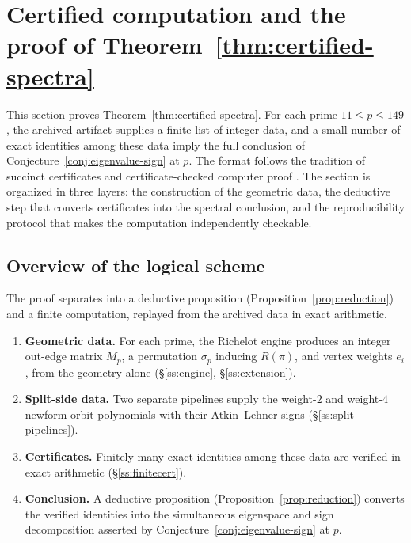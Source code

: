 \documentclass[11pt]{amsart}
\theoremstyle{plain}
\theoremstyle{definition}
\begin{document}
	\section{Certified computation and the proof of Theorem~\ref{thm:certified-spectra}}
	\label{sec:certificates}
	
	This section proves Theorem~\ref{thm:certified-spectra}. For each prime $11\le p\le149$, the archived artifact supplies a finite list of integer data, and a small number of exact identities among these data imply the full conclusion of Conjecture~\ref{conj:eigenvalue-sign} at $p$. The format follows the
	tradition of succinct certificates and certificate-checked computer proof
	\cite{Pratt1975,AtkinMorain1993,RSST1997}. The section is organized in
	three layers: the construction of the geometric data, the deductive step
	that converts certificates into the spectral conclusion, and the
	reproducibility protocol that makes the computation independently
	checkable.
	
	\subsection{Overview of the logical scheme}
	\label{ss:cert-overview}
	
	The proof separates into a deductive proposition (Proposition~\ref{prop:reduction}) and a finite computation, replayed from the archived data in exact arithmetic.
	
	\begin{enumerate}[label=\textup{(\arabic*)},leftmargin=2.4em]
		\item \textbf{Geometric data.} For each prime, the Richelot engine produces
		an integer out-edge matrix $M_p$, a permutation $\sigma_p$ inducing
		$R(\pi)$, and vertex weights $e_i$, from the geometry alone
		(\S\ref{ss:engine}, \S\ref{ss:extension}).
		\item \textbf{Split-side data.} Two separate pipelines supply the weight-$2$
		and weight-$4$ newform orbit polynomials with their Atkin--Lehner signs
		(\S\ref{ss:split-pipelines}).
		\item \textbf{Certificates.} Finitely many exact identities among these
		data are verified in exact arithmetic (\S\ref{ss:finitecert}).
		\item \textbf{Conclusion.} A deductive proposition
		(Proposition~\ref{prop:reduction}) converts the verified identities into
		the simultaneous eigenspace and sign decomposition asserted by
		Conjecture~\ref{conj:eigenvalue-sign} at $p$.
	\end{enumerate}
	
\end{document}
